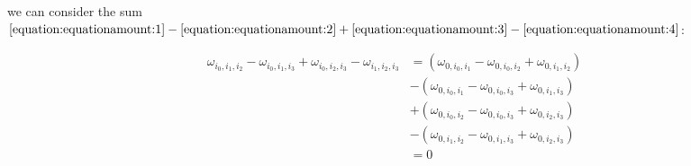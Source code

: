 \documentclass[../SymplecticSimplices.tex]{subfiles}
\begin{document}
we can consider the sum \( \eqref{equation:equationamount:1} - \eqref{equation:equationamount:2} + \eqref{equation:equationamount:3} - \eqref{equation:equationamount:4} \):

\begin{equation*}
  \begin{split}
   \omega_{i_0, i_1, i_2} - \omega_{i_0, i_1, i_3} + \omega_{i_0, i_2, i_3} - \omega_{i_1, i_2, i_3} & = \left( \omega_{0, i_0, i_1} - \omega_{0, i_0, i_2} + \omega_{0, i_1, i_2} \right) \\ & - \left(\omega_{0, i_0, i_1} - \omega_{0, i_0, i_3} + \omega_{0, i_1, i_3} \right) \\ & + \left( \omega_{0, i_0, i_2} - \omega_{0, i_0, i_3} + \omega_{0, i_2, i_3} \right) \\ & - \left( \omega_{0, i_1, i_2} - \omega_{0, i_1, i_3} + \omega_{0, i_2, i_3} \right)
   \\ & = 0
  \end{split}
\end{equation*}
\end{document}
